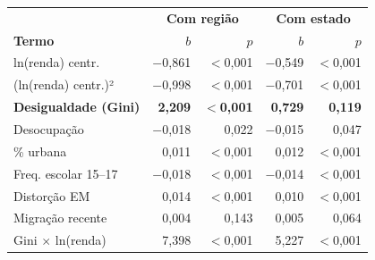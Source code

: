 \begin{tabular}{@{}lrrrr@{}}
\toprule
 & \multicolumn{2}{c}{\textbf{Com região}} & \multicolumn{2}{c}{\textbf{Com estado}}\\
\textbf{Termo} & \textbf{$b$} & \textbf{$p$} & \textbf{$b$} & \textbf{$p$}\\
\midrule
ln(renda) centr. & $-$0,861 & $<$0,001 & $-$0,549 & $<$0,001\\
(ln(renda) centr.)² & $-$0,998 & $<$0,001 & $-$0,701 & $<$0,001\\
\textbf{Desigualdade (Gini)} & \textbf{2,209} & \textbf{$<$0,001} & \textbf{0,729} & \textbf{0,119}\\
Desocupação & $-$0,018 & 0,022 & $-$0,015 & 0,047\\
\% urbana & 0,011 & $<$0,001 & 0,012 & $<$0,001\\
Freq. escolar 15--17 & $-$0,018 & $<$0,001 & $-$0,014 & $<$0,001\\
Distorção EM & 0,014 & $<$0,001 & 0,010 & $<$0,001\\
Migração recente & 0,004 & 0,143 & 0,005 & 0,064\\
Gini $\times$ ln(renda) & 7,398 & $<$0,001 & 5,227 & $<$0,001\\
\bottomrule
\end{tabular}
